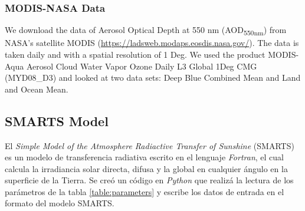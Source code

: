 \subsubsection{MODIS-NASA Data}
We download the data of Aerosol Optical Depth at 550 nm (AOD\textsubscript{550nm}) from NASA’s satellite MODIS (\url{https://ladsweb.modaps.eosdis.nasa.gov/}). The data is taken daily and with a spatial resolution of 1 Deg. We used the product MODIS-Aqua Aerosol Cloud Water Vapor Ozone Daily L3 Global 1Deg CMG (MYD08\_D3) and looked at two data sets: Deep Blue Combined Mean and Land and Ocean Mean.
\subsection{SMARTS Model}
El \textit{Simple Model of the Atmosphere Radiactive Transfer of Sunshine} (SMARTS) es un modelo de transferencia radiativa escrito en el lenguaje \textit{Fortran}, el cual calcula la irradiancia solar directa, difusa y la global en cualquier ángulo en la superficie de la Tierra. Se creó un código en \textit{Python} que realizá la lectura de los parámetros de la tabla \ref{table:parameters} y escribe los datos de entrada en el formato del modelo SMARTS.

